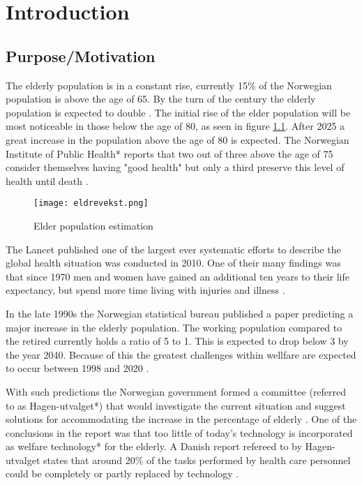 
\chapter{Introduction} %

\label{Chapter1} %


\section{Purpose/Motivation}
The elderly population is in a constant rise, currently 15\% of the Norwegian population is above the age of 65. By the turn of the century the elderly population is expected to double \cite{elder}. The initial rise of the elder population will be most noticeable in those below the age of 80, as seen in figure \ref{fig:elderPopulation}. After 2025 a great increase in the population above the age of 80 is expected. The Norwegian Institute of Public Health* reports that two out of three above the age of 75 consider themselves having "good health" but only a third preserve this level of health until death \cite{elder}.

\begin{figure}[h!]
	\centering	
		\texttt{[image: eldrevekst.png]}
		\caption{\footnotesize Elder population estimation \cite{elder}}
		\label{fig:elderPopulation}
\end{figure}

The Lancet published one of the largest ever systematic efforts to describe the global health situation was conducted in 2010. One of their many findings was that since 1970 men and women have gained an additional ten years to their life expectancy, but spend more time living with injuries and illness \cite{globalBurden}. %

In the late 1990s the Norwegian statistical bureau published a paper predicting a major increase in the elderly population. The working population compared to the retired currently holds a ratio of 5 to 1. This is expected to drop below 3 by the year 2040. Because of this the greatest challenges within wellfare are expected to occur between 1998 and 2020 \cite{eldreEksplosjon}. 

With such predictions the Norwegian government formed a committee (referred to as Hagen-utvalget*) that would investigate the current situation and suggest solutions for accommodating the increase in the percentage of elderly \cite{haagen}. One of the conclusions in the report was that too little of today's technology is incorporated as welfare technology* for the elderly. A Danish report refereed to by Hagen-utvalget states that around 20\% of the tasks performed by health care personnel could be completely or partly replaced by technology \cite{kmd}. 

